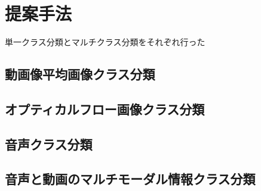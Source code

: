 \chapter{提案手法}
単一クラス分類とマルチクラス分類をそれぞれ行った
\section{動画像平均画像クラス分類}
\section{オプティカルフロー画像クラス分類}
\section{音声クラス分類}
\section{音声と動画のマルチモーダル情報クラス分類}

